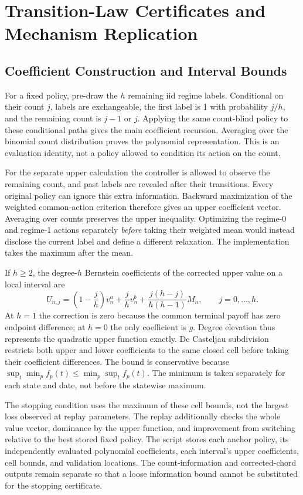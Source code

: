 \section{Transition-Law Certificates and Mechanism Replication}
\subsection{Coefficient Construction and Interval Bounds}
For a fixed policy, pre-draw the $h$ remaining iid regime labels. Conditional on their count $j$, labels are exchangeable, the first label is 1 with probability $j/h$, and the remaining count is $j-1$ or $j$. Applying the same count-blind policy to these conditional paths gives the main coefficient recursion. Averaging over the binomial count distribution proves the polynomial representation. This is an evaluation identity, not a policy allowed to condition its action on the count.

For the separate upper calculation the controller is allowed to observe the remaining count, and past labels are revealed after their transitions. Every original policy can ignore this extra information. Backward maximization of the weighted common-action criterion therefore gives an upper coefficient vector. Averaging over counts preserves the upper inequality. Optimizing the regime-0 and regime-1 actions separately \emph{before} taking their weighted mean would instead disclose the current label and define a different relaxation. The implementation takes the maximum after the mean.

If $h\geq2$, the degree-$h$ Bernstein coefficients of the corrected upper value on a local interval are
\[
 U_{n,j}=\left(1-\frac jh\right)v_n^a+\frac jh v_n^b
       +\frac{j(h-j)}{h(h-1)}M_n,\qquad j=0,\ldots,h.
\]
At $h=1$ the correction is zero because the common terminal payoff has zero endpoint difference; at $h=0$ the only coefficient is $g$. Degree elevation thus represents the quadratic upper function exactly. De Casteljau subdivision restricts both upper and lower coefficients to the same closed cell before taking their coefficient differences. The bound is conservative because
$\sup_t\min_p f_p(t)\leq\min_p\sup_t f_p(t)$.
The minimum is taken separately for each state and date, not before the statewise maximum.

The stopping condition uses the maximum of these cell bounds, not the largest loss observed at replay parameters. The replay additionally checks the whole value vector, dominance by the upper function, and improvement from switching relative to the best stored fixed policy. The script stores each anchor policy, its independently evaluated polynomial coefficients, each interval's upper coefficients, cell bounds, and validation locations. The count-information and corrected-chord outputs remain separate so that a loose information bound cannot be substituted for the stopping certificate.

